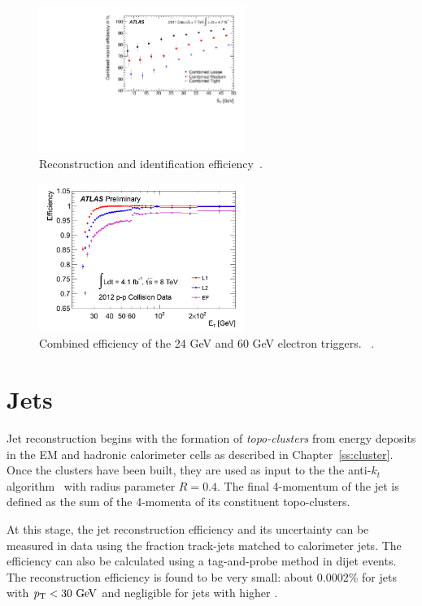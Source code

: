 \begin{figure}[hp]
\centering
\includegraphics[width=0.6\textwidth]{fig/obj/electronID.pdf}
\caption{Reconstruction and identification efficiency~\cite{Aad:2014fxa}.}
\label{fig:electronID}
\end{figure}
\begin{figure}[hp]
\centering
\includegraphics[width=0.6\textwidth]{fig/obj/eltrigger.png}
\caption{Combined efficiency of the 24 GeV and 60 GeV electron triggers. ~\cite{eltrig}.}
\label{fig:eltrigger}
\end{figure}

\section{Jets}
Jet reconstruction begins with the formation of \emph{topo-clusters} from energy deposits in the EM and hadronic calorimeter cells as described in Chapter~\ref{ss:cluster}. Once the clusters have been built, they are used as input to the the anti-$k_t$ algorithm~\cite{antikt1,antikt2,antikt3} with radius parameter $R=0.4$. The final 4-momentum of the jet is defined as the sum of the 4-momenta of its constituent topo-clusters. 

At this stage, the jet reconstruction efficiency and its uncertainty can be measured in data using the fraction track-jets matched to calorimeter jets. The efficiency can also be calculated using a tag-and-probe method in dijet events. The reconstruction efficiency is found to be very small: about 0.0002\% for jets with $\pt< 30 \gev$ and negligible for jets with higher \pt.

